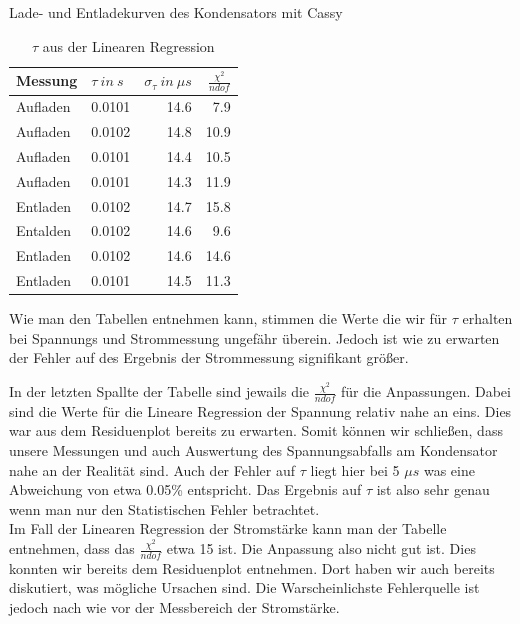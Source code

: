 \documentclass[twoside]{protokoll}
\begin{document}
\begin{aufgabe}{Lade- und Entladekurven des Kondensators mit Cassy}
\begin{table}[H]
        \centering
        \begin{tabularx}{1\textwidth}{X X r r} %
            \toprule
            \textbf{Messung} & \textbf{$\tau \ in \ s$} & \textbf{$\sigma_{\tau} \ in \ \mu s$} & $\frac{\chi^2}{ndof}$ \\
            \midrule
             
            Aufladen & 0.0101 & 14.6 & 7.9 \\
            Aufladen & 0.0102 & 14.8 & 10.9 \\
            Aufladen & 0.0101 & 14.4 & 10.5 \\
            Aufladen & 0.0101 & 14.3 & 11.9 \\
            Entladen & 0.0102 & 14.7 & 15.8 \\
            Entalden & 0.0102 & 14.6 & 9.6 \\
            Entladen & 0.0102 & 14.6 & 14.6 \\
            Entladen & 0.0101 & 14.5 & 11.3 \\
             
            \bottomrule
        \end{tabularx}
        \caption{$\tau$ aus der Linearen Regression}
        \label{tab:mytable}
    \end{table}
    

Wie man den Tabellen entnehmen kann, stimmen die Werte die wir für $\tau$ erhalten bei Spannungs und Strommessung ungefähr überein.
Jedoch ist wie zu erwarten der Fehler auf des Ergebnis der Strommessung signifikant größer. 

In der letzten Spallte der Tabelle sind jewails die $\frac{\chi^2}{ndof}$ für die Anpassungen. Dabei sind die Werte für die Lineare Regression der Spannung relativ nahe an eins.
Dies war aus dem Residuenplot bereits zu erwarten. Somit können wir schließen, dass unsere Messungen und auch Auswertung des Spannungsabfalls am Kondensator nahe an der Realität sind. 
Auch der Fehler auf $\tau$ liegt hier bei 5 $\mu s$ was eine Abweichung von etwa 0.05\% entspricht.  
Das Ergebnis auf $\tau$ ist also sehr genau wenn man nur den Statistischen Fehler betrachtet.\\

Im Fall der Linearen Regression der Stromstärke kann man der Tabelle entnehmen, dass das $\frac{\chi^2}{ndof}$ etwa 15 ist.
Die Anpassung also nicht gut ist. Dies konnten wir bereits dem Residuenplot entnehmen.
Dort haben wir auch bereits diskutiert, was mögliche Ursachen sind. 
Die Warscheinlichste Fehlerquelle ist jedoch nach wie vor der Messbereich der Stromstärke.



\end{aufgabe}
\end{document}
